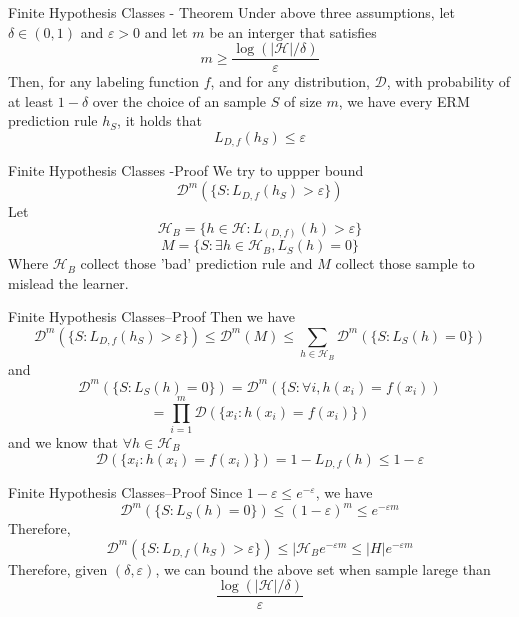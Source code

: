 \documentclass{beamer}
\begin{document}
\begin{frame}{Finite Hypothesis Classes - Theorem}
	Under above three assumptions, let $\delta \in (0,1)$ and $\varepsilon>0$ and let $m$ be an interger that satisfies 
	\[m \geq \frac{\log (|\mathcal{H}|/ \delta)}{\varepsilon}\]
	Then, for any labeling function $f$, and for any distribution, $\mathcal{D}$, with probability of at least $1-\delta$ over the choice of an sample $S$ of size $m$, we have every ERM prediction rule $h_S$, it holds that 
	\[L_{D,f} (h_S) \leq \varepsilon\]
	
\end{frame}
\begin{frame}{Finite Hypothesis Classes -Proof}
	We try to uppper bound
	\[\mathcal{D}^m (\{S: L_{D,f} (h_S)> \varepsilon\})\]
	Let 
	\[\mathcal{H}_B = \{h \in \mathcal{H}: L_{(D,f)}(h) > \varepsilon\}\]
	\[M = \{S: \exists h \in \mathcal{H}_B,L_S(h)=0\}\]
	Where $\mathcal{H}_B$ collect those 'bad' prediction rule and $M$ collect those sample to mislead the learner.
\end{frame}
\begin{frame}{Finite Hypothesis Classes--Proof}
	Then we have 
	\[\mathcal{D}^m(\{S: L_{D,f} (h_S)> \varepsilon\}) \leq \mathcal{D}^m(M) \leq \sum_{h \in \mathcal{H}_B} \mathcal{D}^m(\{S: L_S(h)=0\})\]
	and 
	\[\mathcal{D}^m(\{S: L_S(h)=0\})= \mathcal{D}^m(\{S: \forall i, h(x_i) = f(x_i))\]
		\[=\prod^m_{i=1} \mathcal{D}(\{x_i: h(x_i) = f(x_i)\})\]
	and we know that $\forall h \in \mathcal{H}_B$
	\[\mathcal{D}(\{x_i: h(x_i) = f(x_i)\}) = 1 - L_{D,f} (h) \leq 1 - \varepsilon\]
\end{frame}
\begin{frame}{Finite Hypothesis Classes--Proof}
	Since $1-\varepsilon \leq e^{-\varepsilon}$, we have 
	\[\mathcal{D}^m(\{S:L_S(h)=0\}) \leq (1- \varepsilon)^m \leq e^{-\varepsilon m}\]
	Therefore,
	\[\mathcal{D}^m (\{S: L_{D,f} (h_S)> \varepsilon\}) \leq |\mathcal{H}_B e^{-\varepsilon m} \leq |H| e^{-\varepsilon m}\]
	Therefore, given $(\delta,\varepsilon)$, we can bound the above set when sample larege than
	\[\frac{\log(|\mathcal{H}|/\delta)}{\varepsilon}\]
\end{frame}
\end{document}
